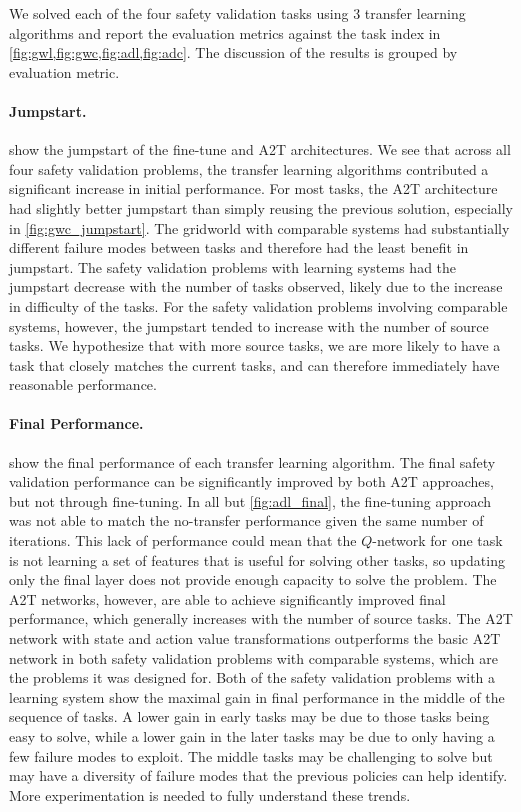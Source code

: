 We solved each of the four safety validation tasks using 3 transfer learning algorithms and report the evaluation metrics against the task index in \cref{fig:gwl,fig:gwc,fig:adl,fig:adc}. The discussion of the results is grouped by evaluation metric. 


\paragraph{Jumpstart.}
 show the jumpstart of the fine-tune and A2T architectures. We see that across all four safety validation problems, the transfer learning algorithms contributed a significant increase in initial performance. For most tasks, the A2T architecture had slightly better jumpstart than simply reusing the previous solution, especially in \cref{fig:gwc_jumpstart}. The gridworld with comparable systems had substantially different failure modes between tasks and therefore had the least benefit in jumpstart.  The safety validation problems with learning systems had the jumpstart decrease with the number of tasks observed, likely due to the increase in difficulty of the tasks. For the safety validation problems involving comparable systems, however, the jumpstart tended to increase with the number of source tasks. We hypothesize that with more source tasks, we are more likely to have a task that closely matches the current tasks, and can therefore immediately have reasonable performance. 

\paragraph{Final Performance.}
 show the final performance of each transfer learning algorithm. The final safety validation performance can be significantly improved by both A2T approaches, but not through fine-tuning. In all but \cref{fig:adl_final}, the fine-tuning approach was not able to match the no-transfer performance given the same number of iterations. This lack of performance could mean that the $Q$-network for one task is not learning a set of features that is useful for solving other tasks, so updating only the final layer does not provide enough capacity to solve the problem.  The A2T networks, however, are able to achieve significantly improved final performance, which generally increases with the number of source tasks. The A2T network with state and action value transformations outperforms the basic A2T network in both safety validation problems with comparable systems, which are the problems it was designed for. Both of the safety validation problems with a learning system show the maximal gain in final performance in the middle of the sequence of tasks. A lower gain in early tasks may be due to those tasks being easy to solve, while a lower gain in the later tasks may be due to only having a few failure modes to exploit. The middle tasks may be challenging to solve but may have a diversity of failure modes that the previous policies can help identify. More experimentation is needed to fully understand these trends. 

